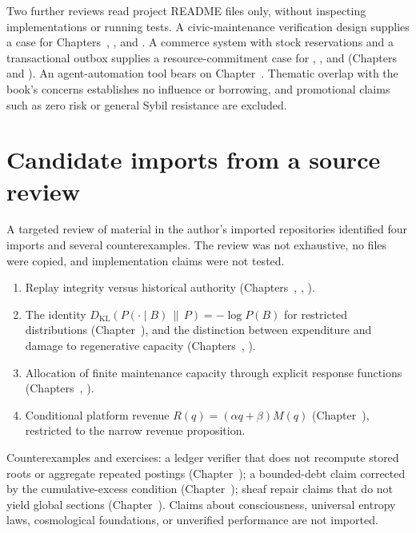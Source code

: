 Two further reviews read project README files only, without inspecting implementations or running tests. A civic-maintenance verification design supplies a case for Chapters~, , and . A commerce system with stock reservations and a transactional outbox supplies a resource-commitment case for , , and  (Chapters~ and ). An agent-automation tool bears on Chapter~. Thematic overlap with the book's concerns establishes no influence or borrowing, and promotional claims such as zero risk or general Sybil resistance are excluded.

\section*{Candidate imports from a source review}

A targeted review of material in the author's imported repositories identified four imports and several counterexamples. The review was not exhaustive, no files were copied, and implementation claims were not tested.

\begin{enumerate}[leftmargin=1.5em]
\item Replay integrity versus historical authority (Chapters~, , ).
\item The identity $D_{\mathrm{KL}}(P(\cdot\mid B)\,\|\,P)=-\log P(B)$ for restricted distributions (Chapter~), and the distinction between expenditure and damage to regenerative capacity (Chapters~, ).
\item Allocation of finite maintenance capacity through explicit response functions (Chapters~, ).
\item Conditional platform revenue $R(q)=(\alpha q+\beta)M(q)$ (Chapter~), restricted to the narrow revenue proposition.
\end{enumerate}

Counterexamples and exercises: a ledger verifier that does not recompute stored roots or aggregate repeated postings (Chapter~); a bounded-debt claim corrected by the cumulative-excess condition (Chapter~); sheaf repair claims that do not yield global sections (Chapter~). Claims about consciousness, universal entropy laws, cosmological foundations, or unverified performance are not imported.
